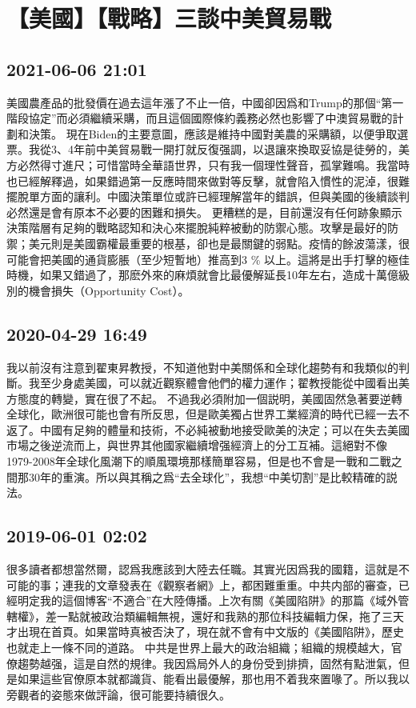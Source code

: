 \documentclass[twocolumn]{ctexart}
\begin{document}
\section*{【美國】【戰略】三談中美貿易戰}
\subsection*{2021-06-06 21:01}

美國農產品的批發價在過去這年漲了不止一倍，中國卻因爲和Trump的那個“第一階段協定”而必須繼續采購，而且這個國際條約義務必然也影響了中澳貿易戰的計劃和決策。
現在Biden的主要意圖，應該是維持中國對美農的采購額，以便爭取選票。我從3、4年前中美貿易戰一開打就反復强調，以退讓來換取妥協是徒勞的，美方必然得寸進尺；可惜當時全華語世界，只有我一個理性聲音，孤掌難鳴。我當時也已經解釋過，如果錯過第一反應時間來做對等反擊，就會陷入慣性的泥淖，很難擺脫單方面的讓利。中國決策單位或許已經理解當年的錯誤，但與美國的後續談判必然還是會有原本不必要的困難和損失。
更糟糕的是，目前還沒有任何跡象顯示決策階層有足夠的戰略認知和決心來擺脫純粹被動的防禦心態。攻擊是最好的防禦；美元則是美國霸權最重要的根基，卻也是最關鍵的弱點。疫情的餘波蕩漾，很可能會把美國的通貨膨脹（至少短暫地）推高到3 \% 以上。這將是出手打擊的極佳時機，如果又錯過了，那麽外來的麻煩就會比最優解延長10年左右，造成十萬億級別的機會損失（Opportunity Cost）。
\subsection*{2020-04-29 16:49}

我以前沒有注意到翟東昇教授，不知道他對中美關係和全球化趨勢有和我類似的判斷。我至少身處美國，可以就近觀察體會他們的權力運作；翟教授能從中國看出美方態度的轉變，實在很了不起。
不過我必須附加一個説明，美國固然急著要逆轉全球化，歐洲很可能也會有所反思，但是歐美獨占世界工業經濟的時代已經一去不返了。中國有足夠的體量和技術，不必純被動地接受歐美的決定；可以在失去美國市場之後逆流而上，與世界其他國家繼續增强經濟上的分工互補。這絕對不像1979-2008年全球化風潮下的順風環境那樣簡單容易，但是也不會是一戰和二戰之間那30年的重演。所以與其稱之爲“去全球化”，我想“中美切割”是比較精確的説法。
\subsection*{2019-06-01 02:02}

很多讀者都想當然爾，認爲我應該到大陸去任職。其實光因爲我的國籍，這就是不可能的事；連我的文章發表在《觀察者網》上，都困難重重。中共内部的審查，已經明定我的這個博客“不適合”在大陸傳播。上次有關《美國陷阱》的那篇《域外管轄權》，差一點就被政治類編輯無視，還好和我熟的那位科技編輯力保，拖了三天才出現在首頁。如果當時真被否決了，現在就不會有中文版的《美國陷阱》，歷史也就走上一條不同的道路。
中共是世界上最大的政治組織；組織的規模越大，官僚趨勢越强，這是自然的規律。我因爲局外人的身份受到排擠，固然有點泄氣，但是如果這些官僚原本就都識貨、能看出最優解，那也用不着我來置喙了。所以我以旁觀者的姿態來做評論，很可能要持續很久。
\end{document}
